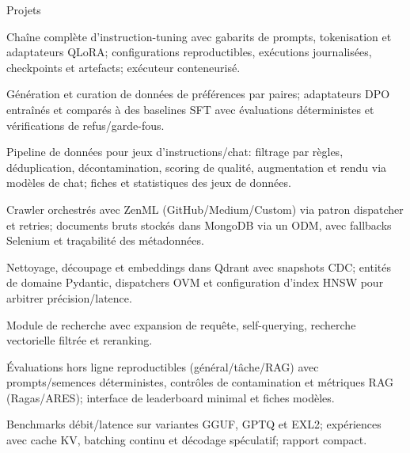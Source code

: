 \begin{rubricnorepeat}{Projets}
\noentry{~}

Chaîne complète d’instruction-tuning avec gabarits de prompts, tokenisation et adaptateurs QLoRA; configurations reproductibles, exécutions journalisées, checkpoints et artefacts; exécuteur conteneurisé.\hfill \href{https://github.com/musel25/instruction-tuning}{\faGithub}

Génération et curation de données de préférences par paires; adaptateurs DPO entraînés et comparés à des baselines SFT avec évaluations déterministes et vérifications de refus/garde-fous.\hfill \href{https://github.com/musel25/preference-alignment-dpo}{\faGithub}

Pipeline de données pour jeux d’instructions/chat: filtrage par règles, déduplication, décontamination, scoring de qualité, augmentation et rendu via modèles de chat; fiches et statistiques des jeux de données.\hfill \href{https://github.com/musel25/instruction-dataset-factory}{\faGithub}

Crawler orchestrés avec ZenML (GitHub/Medium/Custom) via patron dispatcher et retries; documents bruts stockés dans MongoDB via un ODM, avec fallbacks Selenium et traçabilité des métadonnées.\hfill \href{https://github.com/musel25/llm-twin-data-pipeline}{\faGithub}

Nettoyage, découpage et embeddings dans Qdrant avec snapshots CDC; entités de domaine Pydantic, dispatchers OVM et configuration d’index HNSW pour arbitrer précision/latence.\hfill \href{https://github.com/musel25/rag-feature-pipeline}{\faGithub}

Module de recherche avec expansion de requête, self-querying, recherche vectorielle filtrée et reranking.\hfill \href{https://github.com/musel25/rag-inference-advanced}{\faGithub}

Évaluations hors ligne reproductibles (général/tâche/RAG) avec prompts/semences déterministes, contrôles de contamination et métriques RAG (Ragas/ARES); interface de leaderboard minimal et fiches modèles.\hfill \href{https://github.com/musel25/llm-eval-harness}{\faGithub}

Benchmarks débit/latence sur variantes GGUF, GPTQ et EXL2; expériences avec cache KV, batching continu et décodage spéculatif; rapport compact.\hfill \href{https://github.com/musel25/inference-optimization-quantization}{\faGithub}


\end{rubricnorepeat}
